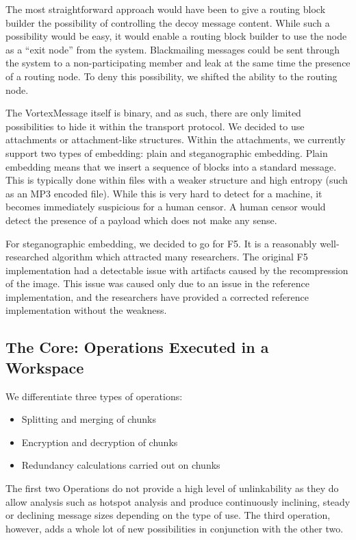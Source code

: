 \documentclass[10pt,journal,compsoc,twocolumn,twoside]{IEEEtran}
\begin{document}
The most straightforward approach would have been to give a routing block builder the possibility of controlling the decoy message content. While such a possibility would be easy, it would enable a routing block builder to use the node as a ``exit node'' from the system. Blackmailing messages could be sent through the system to a non-participating member and leak at the same time the presence of a routing node. To deny this possibility, we shifted the ability to the routing node.

The VortexMessage itself is binary, and as such, there are only limited possibilities to hide it within the transport protocol. We decided to use attachments or attachment-like structures. Within the attachments, we currently support two types of embedding: plain and steganographic embedding. Plain embedding means that we insert a sequence of blocks into a standard message. This is typically done within files with a weaker structure and high entropy (such as an MP3 encoded file). While this is very hard to detect for a machine, it becomes immediately suspicious for a human censor. A human censor would detect the presence of a payload which does not make any sense.

For steganographic embedding, we decided to go for F5\cite{f5}. It is a reasonably well-researched algorithm which attracted many researchers. The original F5 implementation had a detectable issue with artifacts\cite{F5broken} caused by the recompression of the image. This issue was caused only due to an issue in the reference implementation, and the researchers have provided a corrected reference implementation without the weakness. %

\subsection{The Core: Operations Executed in a Workspace}
We differentiate three types of operations:
\begin{itemize}
	\item Splitting and merging of chunks
	\item Encryption and decryption of chunks
	\item Redundancy calculations carried out on chunks
\end{itemize}

The first two Operations do not provide a high level of unlinkability as they do allow analysis such as hotspot analysis and produce continuously inclining, steady or declining message sizes depending on the type of use. The third operation, however, adds a whole lot of new possibilities in conjunction with the other two.
\end{document}
